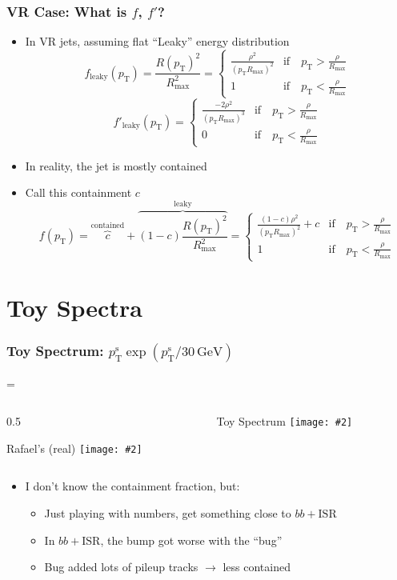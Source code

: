 \documentclass[xcolor={table}]{beamer}
\newcommand{\pt}{p_{\mathrm{T}}}
\newcommand{\ptr}{\pt}
\newcommand{\ptt}{\pt^{\text{s}}}
\newcommand{\graphic}[2][0.99]{\texttt{[image: \#2]}}
\newcommand{\twocol}[3][0.5]{
  \newdimen\scwid
  \scwid=\dimexpr\textwidth-#1\textwidth\relax
  \begin{columns}
    \begin{column}{#1\textwidth}#2\end{column}
      \begin{column}{\scwid}#3\end{column}
  \end{columns}
}
\begin{document}
\begin{frame}
  \frametitle{VR Case: What is $f$, $f'$?}
  \begin{itemize}
  \item In VR jets, assuming flat ``Leaky'' energy distribution
    \[ f_{\text{leaky}}(\ptr) = \frac{R(\ptr)^{2}}{R^{2}_{\text{max}}} = \begin{cases}
      \frac{ \rho^2 }{(\ptr R_{\text{max}})^2}  &\text{if}\quad \ptr > \frac{\rho}{R_{\text{max}}}\\
       1 &\text{if}\quad  \ptr <  \frac{\rho}{R_{\text{max}}}
    \end{cases}
      \]
    \[ f'_{\text{leaky}}(\ptr) = \begin{cases}
      \frac{-2 \rho^2 }{(\ptr R_{\text{max}})^3}  &\text{if}\quad \ptr > \frac{\rho}{R_{\text{max}}}\\
      0 &\text{if}\quad  \ptr <  \frac{\rho}{R_{\text{max}}}
    \end{cases}
    \]
  \item In reality, the jet is mostly contained
  \item Call this containment $c$
    \[ f(\ptr) = \overbrace{c}^{\text{contained}} + \overbrace{(1-c) \frac{R(\ptr)^{2}}{R^{2}_{\text{max}}}}^{\text{leaky}} = \begin{cases}
      \frac{ (1-c) \rho^2 }{(\ptr R_{\text{max}})^2} + c  &
      \text{if}\quad \ptr > \frac{\rho}{R_{\text{max}}} \\
      1 & \text{if}\quad  \ptr <  \frac{\rho}{R_{\text{max}}}
    \end{cases}
      \]
  \end{itemize}
\end{frame}

\section{Toy Spectra}

\begin{frame}
  \frametitle{Toy Spectrum: $\ptt \exp(\ptt / 30\, \text{GeV})$}
  \twocol{
    \begin{center}
      Rafael's (real)
      \graphic{trkjet1_pt.png}
    \end{center}
  }{
    \begin{center}
      Toy Spectrum
      \graphic{{spec.pdf}}
    \end{center}
  }
  \begin{itemize}
  \item I don't know the containment fraction, but:
    \begin{itemize}
    \item Just playing with numbers, get something close to $bb + \text{ISR}$
    \item In $bb + \text{ISR}$, the bump got worse with the ``bug''
    \item Bug added lots of pileup tracks $\to$ less contained
    \end{itemize}
  \end{itemize}
\end{frame}
\end{document}
